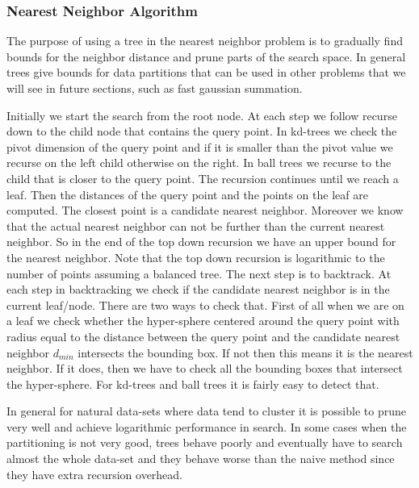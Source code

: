 \documentclass[12pt,letterpaper,doublespaced,ETD,dvips,proposal]{gtthesis}
\begin{document}
\begin{Body}
\subsubsection{Nearest Neighbor Algorithm}
The purpose of using a tree in the nearest neighbor problem is to
gradually find bounds for the neighbor distance and prune parts of
the search space. In general trees give bounds for data partitions
that can be used in other problems that we will see in future
sections, such as fast gaussian summation.

Initially we start the search from the root node. At each step we
follow recurse down to the child node that contains the query point.
In kd-trees we check the pivot dimension of the query point and if
it is smaller than the pivot value we recurse on the left child
otherwise on the right. In ball trees we recurse to the child that
is closer to the query point. The recursion continues until we reach
a leaf. Then the distances of the query point and the points on the
leaf are computed. The closest point is a candidate nearest
neighbor. Moreover we know that the actual nearest neighbor can not
be further than the current nearest neighbor. So in the end of the
top down recursion we have an upper bound for the nearest neighbor.
Note that the top down recursion is logarithmic to the number of
points assuming a balanced tree. The next step is to backtrack. At
each step in backtracking we check if the candidate nearest neighbor
is in the current leaf/node. There are two ways to check that. First
of all when we are on a leaf we check whether the hyper-sphere
centered around the query point with radius equal to the distance
 between the query point and the candidate nearest neighbor
 $d_{min}$ intersects the bounding box. If not then this means it is
 the nearest neighbor. If it does, then we have to check all the
 bounding boxes that intersect the hyper-sphere. For kd-trees and
 ball trees it is fairly easy to detect that.

 In general for natural data-sets where data tend to cluster it is
 possible to prune very well  and achieve logarithmic performance in
 search. In some cases when the partitioning is not very good, trees
 behave poorly and eventually have to search almost the whole
 data-set and they behave worse than the naive method since they
 have extra recursion overhead.


\end{Body}
\end{document}

